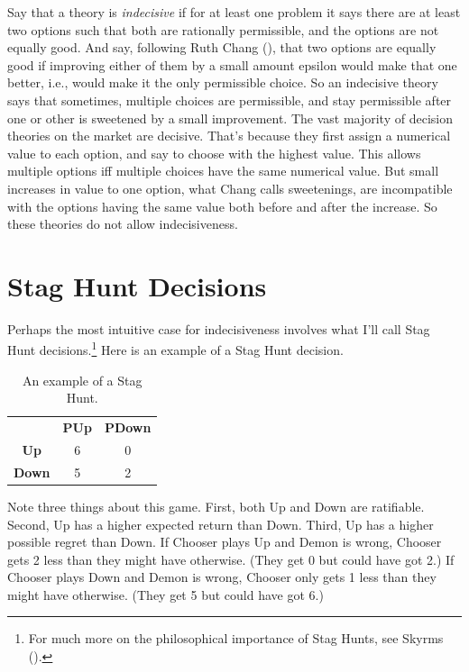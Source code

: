 \documentclass[
  12pt,
  letterpaper,
  DIV=11,
  numbers=noendperiod]{scrreprt}
\begin{document}
Say that a theory is \emph{indecisive} if for at least one problem it
says there are at least two options such that both are rationally
permissible, and the options are not equally good. And say, following
Ruth Chang (), that two options are
equally good if improving either of them by a small amount epsilon would
make that one better, i.e., would make it the only permissible choice.
So an indecisive theory says that sometimes, multiple choices are
permissible, and stay permissible after one or other is sweetened by a
small improvement. The vast majority of decision theories on the market
are decisive. That's because they first assign a numerical value to each
option, and say to choose with the highest value. This allows multiple
options iff multiple choices have the same numerical value. But small
increases in value to one option, what Chang calls sweetenings, are
incompatible with the options having the same value both before and
after the increase. So these theories do not allow indecisiveness.

\section{Stag Hunt Decisions}\label{sec-stag-hunt}

Perhaps the most intuitive case for indecisiveness involves what I'll
call Stag Hunt decisions.\footnote{For much more on the philosophical
  importance of Stag Hunts, see Skyrms
  ().} Here is an example of a Stag Hunt
decision.

\begin{longtable}[]{@{}ccc@{}}
\caption{An example of a Stag Hunt.}\label{tbl-stag-hunt}\tabularnewline
\toprule\noalign{}
\endfirsthead
\endhead
\bottomrule\noalign{}
\endlastfoot
& \textbf{PUp} & \textbf{PDown} \\
\textbf{Up} & 6 & 0 \\
\textbf{Down} & 5 & 2 \\
\end{longtable}

Note three things about this game. First, both Up and Down are
ratifiable. Second, Up has a higher expected return than Down. Third, Up
has a higher possible regret than Down. If Chooser plays Up and Demon is
wrong, Chooser gets 2 less than they might have otherwise. (They get 0
but could have got 2.) If Chooser plays Down and Demon is wrong, Chooser
only gets 1 less than they might have otherwise. (They get 5 but could
have got 6.)
\end{document}
